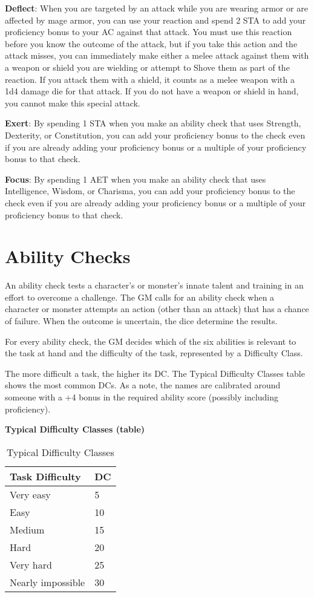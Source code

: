 \textbf{Deflect}: When you are targeted by an attack while you are wearing armor or are affected by mage armor, you can use your reaction and spend 2 STA to add your proficiency bonus to your AC against that attack. You must use this reaction before you know the outcome of the attack, but if you take this action and the attack misses, you can immediately make either a melee attack against them with a weapon or shield you are wielding or attempt to Shove them as part of the reaction. If you attack them with a shield, it counts as a melee weapon with a 1d4 damage die for that attack. If you do not have a weapon or shield in hand, you cannot make this special attack.

\textbf{Exert}: By spending 1 STA when you make an ability check that uses Strength, Dexterity, or Constitution, you can add your proficiency bonus to the check even if you are already adding your proficiency bonus or a multiple of your proficiency bonus to that check.

\textbf{Focus}: By spending 1 AET when you make an ability check that uses Intelligence, Wisdom, or Charisma, you can add your proficiency bonus to the check even if you are already adding your proficiency bonus or a multiple of your proficiency bonus to that check.

\section{Ability Checks}

An ability check tests a character's or monster's innate talent and training in an effort to overcome a challenge. The GM calls for an ability check when a character or monster attempts an action (other than an attack) that has a chance of failure. When the outcome is uncertain, the dice determine the results.

For every ability check, the GM decides which of the six abilities is relevant to the task at hand and the difficulty of the task, represented by a Difficulty Class.

The more difficult a task, the higher its DC. The Typical Difficulty Classes table shows the most common DCs. As a note, the names are calibrated around someone with a +4 bonus in the required ability score (possibly including proficiency).

\textbf{Typical Difficulty Classes (table)}
\begin{table}
    \centering
    \begin{tabular}{|l|l|}
        \hline
        Task Difficulty & DC  \\\hline
        Very easy & 5 \\\hline
        Easy & 10 \\\hline
        Medium & 15 \\\hline
        Hard & 20 \\\hline
        Very hard & 25 \\\hline
        Nearly impossible & 30 \\\hline
    \end{tabular}
    \caption[DCs]{Typical Difficulty Classes}
    \label{tbl:dcs}
\end{table}

